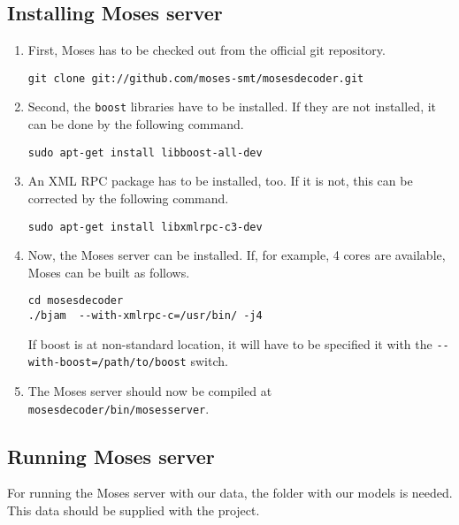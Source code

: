 \subsection{Installing Moses server}
\begin{enumerate}
    \item
First, Moses has to be checked out from the official git repository.

\begin{lstlisting}
git clone git://github.com/moses-smt/mosesdecoder.git
\end{lstlisting}

\item
Second, the \texttt{boost} libraries have to be installed. If they are not installed, it can be done by the following command.

\begin{lstlisting}
sudo apt-get install libboost-all-dev
\end{lstlisting}

\item
An XML RPC package has to be installed, too. If it is not, this can be corrected by the following command.

\begin{lstlisting}
sudo apt-get install libxmlrpc-c3-dev
\end{lstlisting}

\item
Now, the Moses server can be installed. If, for example, 4 cores are available, Moses can be built as follows.

\begin{lstlisting}
cd mosesdecoder
./bjam  --with-xmlrpc-c=/usr/bin/ -j4
\end{lstlisting}

If boost is at non-standard location, it will have to be specified it with the \texttt{-{}-with-boost=/path/to/boost} switch.

\item
The Moses server should now be compiled at \texttt{mosesdecoder/bin/mosesserver}.
\end{enumerate}

\subsection{Running Moses server}
For running the Moses server with our data, the folder with our models is needed. This data should be supplied with the project.

